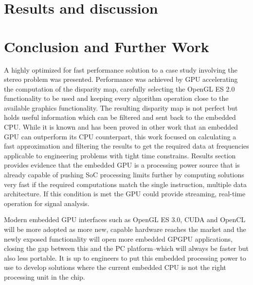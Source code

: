\documentclass[conference]{IEEEtran}
\begin{document}

\section{Results and discussion}




\section{Conclusion and Further Work}

A highly optimized for fast performance solution to a case study involving the stereo problem was presented. Performance was achieved by GPU accelerating the computation of the disparity map, carefully selecting the OpenGL ES 2.0 functionality to be used and keeping every algorithm operation close to the available graphics functionality. The resulting disparity map is not perfect but holds useful information which can be filtered and sent back to the embedded CPU. While it is known and has been proved in other work that an embedded GPU can outperform its CPU counterpart, this work focused on calculating a fast approximation and filtering the results to get the required data at frequencies applicable to engineering problems with tight time constrains. Results section provides evidence that the embedded GPU is a processing power source that is already capable of pushing SoC processing limits further by computing solutions very fast if the required computations match the single instruction, multiple data architecture. If this condition is met the GPU could provide streaming, real-time operation for signal analysis.

Modern embedded GPU interfaces such as OpenGL ES 3.0, CUDA and OpenCL will be more adopted as more new, capable hardware reaches the market and the newly exposed functionality will open more embedded GPGPU applications, closing the gap between this and the PC platform--which will always be faster but also less portable. It is up to engineers to put this embedded processing power to use to develop solutions where the current embedded CPU is not the right processing unit in the chip.





\end{document}
